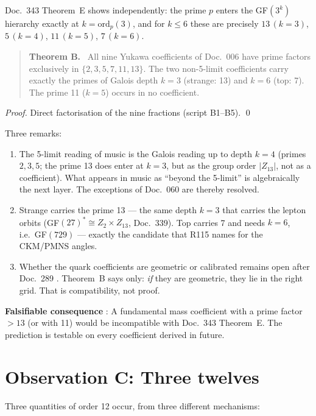 Doc.~343 Theorem~E shows independently: the prime $p$ enters the
GF$(3^k)$ hierarchy exactly at $k=\mathrm{ord}_p(3)$, and for $k\le6$
these are precisely $13\,(k=3)$, $5\,(k=4)$, $11\,(k=5)$, $7\,(k=6)$.

\begin{quote}
\textbf{Theorem B.} \BM\ All nine Yukawa coefficients of Doc.~006 have
prime factors exclusively in $\{2,3,5,7,11,13\}$. The two non-5-limit
coefficients carry exactly the primes of Galois depth $k=3$ (strange: 13)
and $k=6$ (top: 7). The prime 11 ($k=5$) occurs in no coefficient.
\end{quote}

\emph{Proof.} Direct factorisation of the nine fractions
(script B1--B5). \qed

Three remarks:

\begin{enumerate}
\item The 5-limit reading of music is the Galois reading up to depth
  $k=4$ (primes $2,3,5$; the prime 13 does enter at $k=3$, but as the
  group order $|Z_{13}|$, not as a coefficient). What appears in music as
  ``beyond the 5-limit'' is algebraically the next layer. The exceptions
  of Doc.~060 are thereby resolved.
\item Strange carries the prime 13 --- the same depth $k=3$ that carries
  the lepton orbits (GF$(27)^*\cong Z_2\times Z_{13}$, Doc.~339). Top
  carries 7 and needs $k=6$, i.e.\ GF$(729)$ --- exactly the candidate
  that R115 names for the CKM/PMNS angles.
\item Whether the quark coefficients are geometric or calibrated remains
  open after Doc.~289 \SM. Theorem~B says only: \emph{if} they are
  geometric, they lie in the right grid. That is compatibility, not proof.
\end{enumerate}

\textbf{Falsifiable consequence} \KM: A fundamental mass coefficient with
a prime factor $>13$ (or with 11) would be incompatible with Doc.~343
Theorem~E. The prediction is testable on every coefficient derived in future.

\section{Observation C: Three twelves}

Three quantities of order 12 occur, from three different mechanisms:

